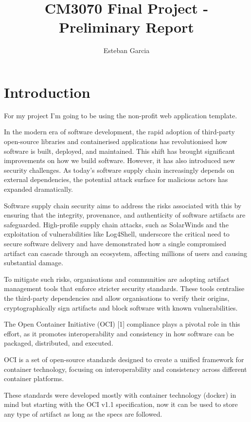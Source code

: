 \documentclass{article}
\title{CM3070 Final Project - Preliminary Report}
\author{Esteban Garcia}
\date{ }
\begin{document}
  \maketitle

  \tableofcontents

  \newpage
  \section{Introduction}

  For my project I'm going to be using the non-profit web application template.

  In the modern era of software development, the rapid adoption of third-party open-source libraries and containerised applications has revolutionised how software is built, deployed, and maintained. This shift has brought significant improvements on how we build software. However, it has also introduced new security challenges. As today's software supply chain increasingly depends on external dependencies, the potential attack surface for malicious actors has expanded dramatically.

  Software supply chain security aims to address the risks associated with this by ensuring that the integrity, provenance, and authenticity of software artifacts are safeguarded. High-profile supply chain attacks, such as SolarWinds and the exploitation of vulnerabilities like Log4Shell, underscore the critical need to secure software delivery and have demonstrated how a single compromised artifact can cascade through an ecosystem, affecting millions of users and causing substantial damage.

  To mitigate such risks, organisations and communities are adopting artifact management tools that enforce stricter security standards. These tools centralise the third-party dependencies and allow organisations to verify their origins, cryptographically sign artifacts and block software with known vulnerabilities.

  The Open Container Initiative (OCI) [1] compliance plays a pivotal role in this effort, as it promotes interoperability and consistency in how software can be packaged, distributed, and executed.

  OCI is a set of open-source standards designed to create a unified framework for container technology, focusing on interoperability and consistency across different container platforms.

  These standards were developed mostly with container technology (docker) in mind but starting with the OCI v1.1 specification, now it can be used to store any type of artifact as long as the specs are followed.
\end{document}
